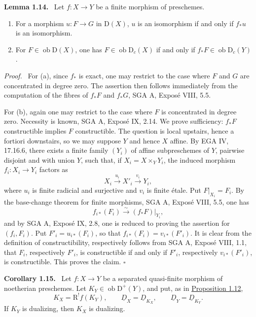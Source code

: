 \documentclass[11pt]{article}
\providecommand{\qedtext}{\hfill$\square$}
\newenvironment{statement}[1]{\par\medskip\noindent\textbf{#1.}\ }{\par\medskip}
\newenvironment{prooftext}[1][Proof]{\par\noindent\emph{#1.}\ }{\par\medskip}
\newcommand{\R}{\mathrm{R}}
\newcommand{\D}{\mathrm{D}}
\newcommand{\ob}{\operatorname{ob}}
\providecommand{\ob}{\operatorname{ob}}
\providecommand{\R}{\mathrm R}
\providecommand{\qedtext}{\hfill$\square$}
\begin{document}
\label{sga5:I:lemma:1.14}\begin{statement}{Lemma 1.14}
Let $f:X\to Y$ be a finite morphism of preschemes.
\begin{enumerate}[label=\alph*)]
\item For a morphism $u:F\to G$ in $\D(X)$, $u$ is an isomorphism if and only if $f_*u$ is an isomorphism.
\item For $F\in\ob\D(X)$, one has $F\in\ob\D_c(X)$ if and only if $f_*F\in\ob\D_c(Y)$.
\end{enumerate}
\end{statement}

\begin{prooftext}
For (a), since $f_*$ is exact, one may restrict to the case where $F$ and $G$ are concentrated in degree zero. The assertion then follows immediately from the computation of the fibres of $f_*F$ and $f_*G$, SGA A, Exposé VIII, 5.5.

For (b), again one may restrict to the case where $F$ is concentrated in degree zero. Necessity is known, SGA A, Exposé IX, 2.14. We prove sufficiency: $f_*F$ constructible implies $F$ constructible. The question is local upstairs, hence a fortiori downstairs, so we may suppose $Y$ and hence $X$ affine. By EGA IV, 17.16.6, there exists a finite family $(Y_i)$ of affine subpreschemes of $Y$, pairwise disjoint and with union $Y$, such that, if $X_i=X\times_YY_i$, the induced morphism $f_i:X_i\to Y_i$ factors as
\[
   X_i\xrightarrow{u_i}X'_i\xrightarrow{v_i}Y_i,
\]
where $u_i$ is finite radicial and surjective and $v_i$ is finite étale. Put $F|_{X_i}=F_i$. By the base-change theorem for finite morphisms, SGA A, Exposé VIII, 5.5, one has
\[
   f_{i*}(F_i)\xrightarrow{\sim}(f_*F)|_{Y_i},
\]
and by SGA A, Exposé IX, 2.8, one is reduced to proving the assertion for $(f_i,F_i)$. Put $F'_i=u_{i*}(F_i)$, so that $f_{i*}(F_i)=v_{i*}(F'_i)$. It is clear from the definition of constructibility, respectively follows from SGA A, Exposé VIII, 1.1, that $F_i$, respectively $F'_i$, is constructible if and only if $F'_i$, respectively $v_{i*}(F'_i)$, is constructible. This proves the claim. \qedtext
\end{prooftext}

\label{sga5:I:corollary:1.15}\begin{statement}{Corollary 1.15}
Let $f:X\to Y$ be a separated quasi-finite morphism of noetherian preschemes. Let $K_Y\in\ob\D^+(Y)$, and put, as in \hyperref[sga5:I:proposition:1.12]{Proposition 1.12},
\[
   K_X=\R^!f(K_Y),\qquad \underline D_X=\underline D_{K_X},\qquad \underline D_Y=\underline D_{K_Y}.
\]
If $K_Y$ is dualizing, then $K_X$ is dualizing.
\end{statement}
\end{document}
